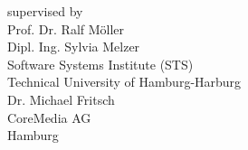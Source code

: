 \documentclass[12pt,a4paper]{extreport}
\begin{document}
\begin{titlepage}
\begin{minipage}[b]{1\linewidth}
\begin{flushright}
\bigskip 
supervised by\\
\large
Prof. Dr. Ralf M\"oller\\
Dipl. Ing. Sylvia Melzer\\
\bigskip
Software Systems Institute (STS)\\
Technical University of Hamburg-Harburg\\
\bigskip
Dr. Michael Fritsch\\
CoreMedia AG\\
Hamburg\\
\bigskip 
\bigskip
\end{flushright}
\end{minipage}

\end{titlepage}

%

%
%


\makeatletter
\renewcommand{\fnum@figure}{\textbf{Figure~\thefigure}}
\makeatother

\tableofcontents
\listoffigures








%
\printglossaries


\begin{appendix}

\end{appendix}


% 


\end{document}
